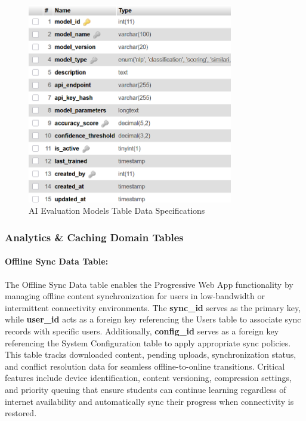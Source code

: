 \documentclass[12pt,a4paper,oneside]{book}
\begin{document}
\begin{figure}[H]
\centering
\includegraphics[width=0.8\textwidth]{assets/DBTable/Table4.9.png}
\caption{AI Evaluation Models Table Data Specifications}
\label{table:ai_evaluation_models}
\end{figure}

\clearpage
\subsubsection{Analytics \& Caching Domain Tables}

\paragraph{Offline Sync Data Table:}
The Offline Sync Data table enables the Progressive Web App functionality by managing offline content synchronization for users in low-bandwidth or intermittent connectivity environments. The \textbf{sync\_id} serves as the primary key, while \textbf{user\_id} acts as a foreign key referencing the Users table to associate sync records with specific users. Additionally, \textbf{config\_id} serves as a foreign key referencing the System Configuration table to apply appropriate sync policies. This table tracks downloaded content, pending uploads, synchronization status, and conflict resolution data for seamless offline-to-online transitions. Critical features include device identification, content versioning, compression settings, and priority queuing that ensure students can continue learning regardless of internet availability and automatically sync their progress when connectivity is restored.
\end{document}
